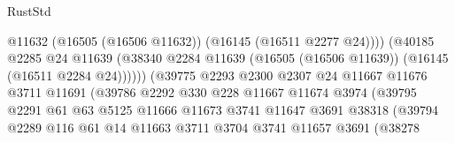\begin{lexlean}{RustStd}
\begin{coremodule}
                                              @11632
                                              (@16505 (@16506 @11632))
                                              (@16145 (@16511 @2277 @24))))
                                          (@40185
                                            @2285
                                            @24
                                            @11639
                                            (@38340
                                              @2284
                                              @11639
                                              (@16505 (@16506 @11639))
                                              (@16145 (@16511 @2284 @24))))))
                                      (@39775
                                        @2293
                                        @2300
                                        @2307
                                        @24
                                        @11667
                                        @11676
                                        @3711
                                        @11691
                                        (@39786
                                          @2292
                                          @330
                                          @228
                                          @11667
                                          @11674
                                          @3974
                                          (@39795
                                            @2291
                                            @61
                                            @63
                                            @5125
                                            @11666
                                            @11673
                                            @3741
                                            @11647
                                            @3691
                                            @38318
                                            (@39794
                                              @2289
                                              @116
                                              @61
                                              @14
                                              @11663
                                              @3711
                                              @3704
                                              @3741
                                              @11657
                                              @3691
                                              (@38278

\end{coremodule}
\end{lexlean}
